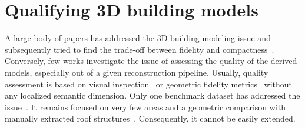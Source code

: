     \section{Qualifying 3D building models}

        A large body of papers has addressed the 3D building modeling issue and subsequently tried to find the trade-off between fidelity and compactness~\citep{dick2004modelling, zebedin2008fusion, Lafarge2010, verdie2015lod}. Conversely, few works investigate the issue of assessing the quality of the derived models, especially out of a given reconstruction pipeline. Usually, quality assessment is based on visual inspection~\citep{Durupt2006, MacayMoreia2013} or geometric fidelity metrics~\citep{Kaartinen2005} without any localized semantic dimension. Only one benchmark dataset has addressed the issue~\citep{rottensteiner2014results}. It remains focused on very few areas and a geometric comparison with manually extracted roof structures~\citep{li2016boxfitting, nan2017polyfit, nguatem2017modeling}. Consequently, it cannot be easily extended.

